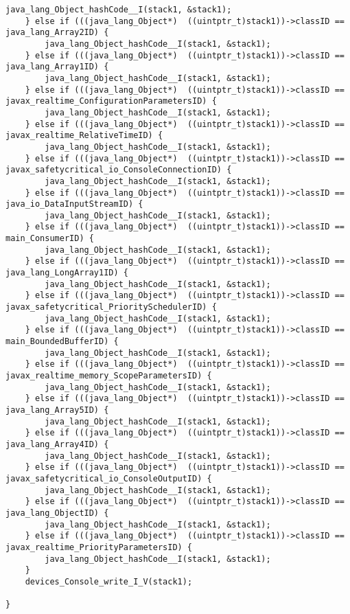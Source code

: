 \begin{lstlisting}[firstnumber=380]
		java_lang_Object_hashCode__I(stack1, &stack1);
	} else if (((java_lang_Object*)  ((uintptr_t)stack1))->classID == java_lang_Array2ID) {
		java_lang_Object_hashCode__I(stack1, &stack1);
	} else if (((java_lang_Object*)  ((uintptr_t)stack1))->classID == java_lang_Array1ID) {
		java_lang_Object_hashCode__I(stack1, &stack1);
	} else if (((java_lang_Object*)  ((uintptr_t)stack1))->classID == javax_realtime_ConfigurationParametersID) {
		java_lang_Object_hashCode__I(stack1, &stack1);
	} else if (((java_lang_Object*)  ((uintptr_t)stack1))->classID == javax_realtime_RelativeTimeID) {
		java_lang_Object_hashCode__I(stack1, &stack1);
	} else if (((java_lang_Object*)  ((uintptr_t)stack1))->classID == javax_safetycritical_io_ConsoleConnectionID) {
		java_lang_Object_hashCode__I(stack1, &stack1);
	} else if (((java_lang_Object*)  ((uintptr_t)stack1))->classID == java_io_DataInputStreamID) {
		java_lang_Object_hashCode__I(stack1, &stack1);
	} else if (((java_lang_Object*)  ((uintptr_t)stack1))->classID == main_ConsumerID) {
		java_lang_Object_hashCode__I(stack1, &stack1);
	} else if (((java_lang_Object*)  ((uintptr_t)stack1))->classID == java_lang_LongArray1ID) {
		java_lang_Object_hashCode__I(stack1, &stack1);
	} else if (((java_lang_Object*)  ((uintptr_t)stack1))->classID == javax_safetycritical_PrioritySchedulerID) {
		java_lang_Object_hashCode__I(stack1, &stack1);
	} else if (((java_lang_Object*)  ((uintptr_t)stack1))->classID == main_BoundedBufferID) {
		java_lang_Object_hashCode__I(stack1, &stack1);
	} else if (((java_lang_Object*)  ((uintptr_t)stack1))->classID == javax_realtime_memory_ScopeParametersID) {
		java_lang_Object_hashCode__I(stack1, &stack1);
	} else if (((java_lang_Object*)  ((uintptr_t)stack1))->classID == java_lang_Array5ID) {
		java_lang_Object_hashCode__I(stack1, &stack1);
	} else if (((java_lang_Object*)  ((uintptr_t)stack1))->classID == java_lang_Array4ID) {
		java_lang_Object_hashCode__I(stack1, &stack1);
	} else if (((java_lang_Object*)  ((uintptr_t)stack1))->classID == javax_safetycritical_io_ConsoleOutputID) {
		java_lang_Object_hashCode__I(stack1, &stack1);
	} else if (((java_lang_Object*)  ((uintptr_t)stack1))->classID == java_lang_ObjectID) {
		java_lang_Object_hashCode__I(stack1, &stack1);
	} else if (((java_lang_Object*)  ((uintptr_t)stack1))->classID == javax_realtime_PriorityParametersID) {
		java_lang_Object_hashCode__I(stack1, &stack1);
	}
	devices_Console_write_I_V(stack1);

}
\end{lstlisting}

